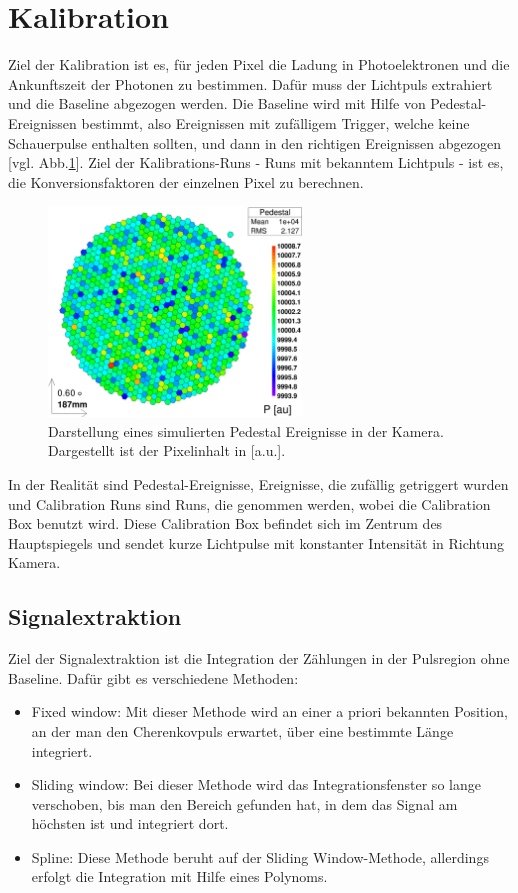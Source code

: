 \section{Kalibration}
\label{sec:Calibration}
Ziel der Kalibration ist es, für jeden Pixel die Ladung in Photoelektronen und die Ankunftszeit der Photonen zu bestimmen.
Dafür muss der Lichtpuls extrahiert und die Baseline abgezogen werden.
Die Baseline wird mit Hilfe von Pedestal-Ereignissen bestimmt, also Ereignissen mit zufälligem Trigger, welche keine Schauerpulse enthalten sollten, und dann in den richtigen Ereignissen abgezogen [vgl. Abb.\ref{Kamera-Bild-Pedestal}].
Ziel der Kalibrations-Runs - Runs mit bekanntem Lichtpuls - ist es, die Konversionsfaktoren der einzelnen Pixel zu berechnen.

\begin{figure}
    \centering
    \includegraphics[width=0.6\textwidth]{./Plots/03_MonteCarlos/Pedestal_fertig.png}
    \caption{Darstellung eines simulierten Pedestal Ereignisse in der Kamera. Dargestellt ist der Pixelinhalt in [a.u.].}
    \label{Kamera-Bild-Pedestal}
\end{figure}

In der Realität sind Pedestal-Ereignisse, Ereignisse, die zufällig getriggert wurden und Calibration Runs sind Runs, die genommen werden, wobei die Calibration Box benutzt wird.
Diese Calibration Box befindet sich im Zentrum des Hauptspiegels und sendet kurze Lichtpulse mit konstanter Intensität in Richtung Kamera.


\subsection{Signalextraktion}
Ziel der Signalextraktion ist die Integration der Zählungen in der Pulsregion ohne Baseline.
Dafür gibt es verschiedene Methoden:
\begin{itemize}
 \item Fixed window: Mit dieser Methode wird an einer a priori bekannten Position, an der man den Cherenkovpuls erwartet, über eine bestimmte Länge integriert.
 \item Sliding window: Bei dieser Methode wird das Integrationsfenster so lange verschoben, bis man den Bereich gefunden hat, in dem das Signal am höchsten ist und integriert dort.
 \item Spline: Diese Methode beruht auf der Sliding Window-Methode, allerdings erfolgt die Integration mit Hilfe eines Polynoms.
\end{itemize}

